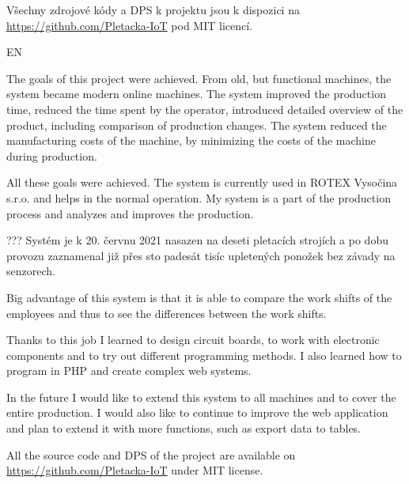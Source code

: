 \documentclass[12pt, a4paper]{article}
\begin{document}
Všechny zdrojové kódy a DPS k projektu jsou k dispozici na \url{https://github.com/Pletacka-IoT} pod MIT licencí.

EN

The goals of this project were achieved. From old, but functional machines, the system became modern online machines.
The system improved the production time, reduced the time spent by the operator, introduced detailed overview of the product, including comparison of production changes.
The system reduced the manufacturing costs of the machine, by minimizing the costs of the machine during production.


All these goals were achieved.
The system is currently used in ROTEX Vysočina s.r.o. and helps in the normal operation.
My system is a part of the production process and analyzes and improves the production.

??? Systém je k 20. červnu 2021 nasazen na deseti pletacích strojích a po dobu provozu zaznamenal již přes sto padesát tisíc upletených ponožek bez závady na senzorech.

Big advantage of this system is that it is able to compare the work shifts of the employees and thus to see the differences between the work shifts.

Thanks to this job I learned to design circuit boards, to work with electronic components and to try out different programming methods.
I also learned how to program in PHP and create complex web systems.

In the future I would like to extend this system to all machines and to cover the entire production.
I would also like to continue to improve the web application and plan to extend it with more functions, such as export data to tables.

All the source code and DPS of the project are available on \url{https://github.com/Pletacka-IoT} under MIT license.


\newpage





\appendix
\end{document}
